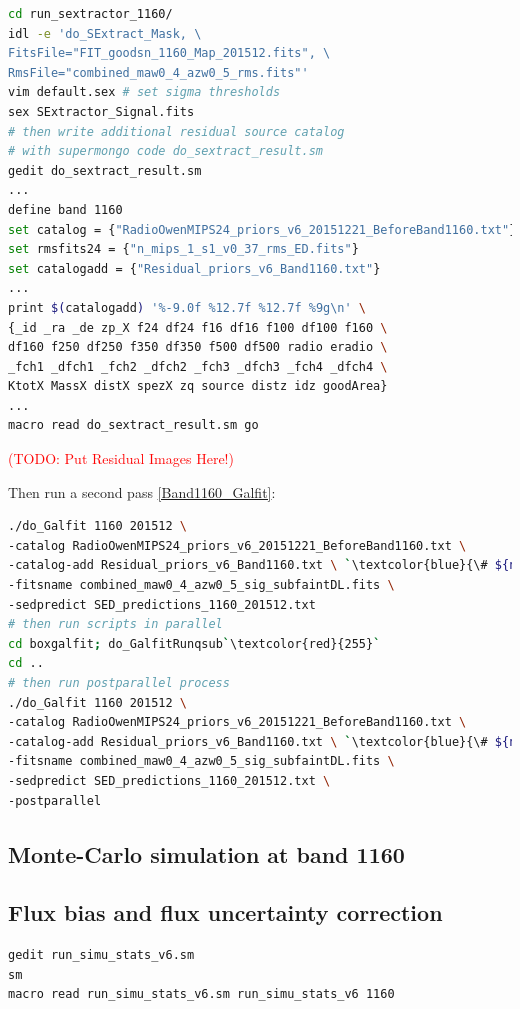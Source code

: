 \documentclass[11pt,a4paper]{article}
\begin{document}
\begin{lstlisting}[language=bash]
cd run_sextractor_1160/
idl -e 'do_SExtract_Mask, \
FitsFile="FIT_goodsn_1160_Map_201512.fits", \
RmsFile="combined_maw0_4_azw0_5_rms.fits"'
vim default.sex # set sigma thresholds
sex SExtractor_Signal.fits
# then write additional residual source catalog
# with supermongo code do_sextract_result.sm
gedit do_sextract_result.sm
...
define band 1160
set catalog = {"RadioOwenMIPS24_priors_v6_20151221_BeforeBand1160.txt"}
set rmsfits24 = {"n_mips_1_s1_v0_37_rms_ED.fits"}
set catalogadd = {"Residual_priors_v6_Band1160.txt"}
...
print $(catalogadd) '%-9.0f %12.7f %12.7f %9g\n' \
{_id _ra _de zp_X f24 df24 f16 df16 f100 df100 f160 \
df160 f250 df250 f350 df350 f500 df500 radio eradio \
_fch1 _dfch1 _fch2 _dfch2 _fch3 _dfch3 _fch4 _dfch4 \
KtotX MassX distX spezX zq source distz idz goodArea}
...
macro read do_sextract_result.sm go
\end{lstlisting}

\textcolor{red}{(TODO: Put Residual Images Here!)}

Then run a second pass \ref{Band1160_Galfit}: 

\begin{lstlisting}[language=bash]
./do_Galfit 1160 201512 \
-catalog RadioOwenMIPS24_priors_v6_20151221_BeforeBand1160.txt \
-catalog-add Residual_priors_v6_Band1160.txt \ `\textcolor{blue}{\# ${new!}$}`
-fitsname combined_maw0_4_azw0_5_sig_subfaintDL.fits \
-sedpredict SED_predictions_1160_201512.txt
# then run scripts in parallel 
cd boxgalfit; do_GalfitRunqsub`\textcolor{red}{255}`
cd ..
# then run postparallel process
./do_Galfit 1160 201512 \
-catalog RadioOwenMIPS24_priors_v6_20151221_BeforeBand1160.txt \
-catalog-add Residual_priors_v6_Band1160.txt \ `\textcolor{blue}{\# ${new!}$}`
-fitsname combined_maw0_4_azw0_5_sig_subfaintDL.fits \
-sedpredict SED_predictions_1160_201512.txt \
-postparallel
\end{lstlisting}

\subsection{Monte-Carlo simulation at band 1160}
\label{Band1160_Galsim}

\subsection{Flux bias and flux uncertainty correction}
\label{Band1160_dfcorr}

\begin{lstlisting}[language=bash]
gedit run_simu_stats_v6.sm
sm
macro read run_simu_stats_v6.sm run_simu_stats_v6 1160
\end{lstlisting}
\end{document}
